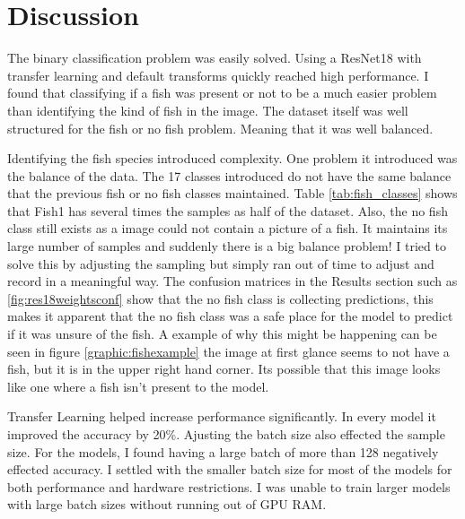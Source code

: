 \section{Discussion}
The binary classification problem was easily solved.
Using a ResNet18 with transfer learning and default transforms quickly reached high performance.
I found that classifying if a fish was present or not to be a much easier problem than identifying the kind of fish in the image.
The dataset itself was well structured for the fish or no fish problem. Meaning that it was well balanced.

Identifying the fish species introduced complexity. One problem it introduced was the balance of the data. 
The 17 classes introduced do not have the same balance that the previous fish or no fish classes maintained.
Table \ref{tab:fish_classes} shows that Fish1 has several times the samples as half of the dataset.  
Also, the no fish class still exists as a image could not contain a picture of a fish. 
It maintains its large number of samples and suddenly there is a big balance problem!
I tried to solve this by adjusting the sampling but simply ran out of time to adjust and record in a meaningful way.
The confusion matrices in the Results section such as \ref{fig:res18weightsconf} show that the no fish class is collecting predictions, this makes it apparent that the no fish class was a safe place for the model to predict if it was unsure of the fish.
A example of why this might be happening can be seen in figure \ref{graphic:fishexample} the image at first glance seems to not have a fish, but it is in the upper right hand corner.
Its possible that this image looks like one where a fish isn't present to the model.

Transfer Learning helped increase performance significantly. In every model it improved the accuracy by 20\%.  
Ajusting the batch size also effected the sample size. For the models, I found having a large batch of more than 128 negatively effected accuracy. I settled with the smaller batch size for most of the models for both performance and hardware restrictions. I was unable to train larger models with large batch sizes without running out of GPU RAM.
